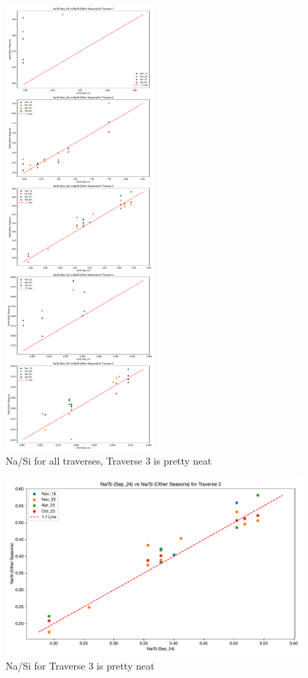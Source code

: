 \FloatBarrier

\begin{figure}[h]
    \centering
    \includegraphics[width=0.5\textwidth]{Na_Si_AllTrav.pdf}
    \caption{Na/Si for all traverses, Traverse 3 is pretty neat}
    \label{fig:spatial_changes_spring8}
\end{figure}

\FloatBarrier


\begin{figure}[h]
    \centering
    \includegraphics[width=\textwidth]{Na_Si_Trav3.pdf}
    \caption{Na/Si for Traverse 3 is pretty neat}
    \label{fig:spatial_changes_spring9}
\end{figure}

